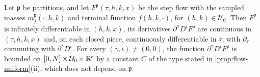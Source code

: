 \begin{lemma}\label{lem:flow-step-bounds}
Let $\mathfrak p$ be partitions, and let $F^{\mathfrak p}(\tau,h,k,x)$ be the step
flow with the sampled masses $m_j^{\mathfrak p}(\cdot,h,k)$ and terminal function
$f(h,k,\cdot)$, for $(h,k)\in\mathcal U_0$. Then $F^{\mathfrak p}$ is infinitely
differentiable in $(h,k,x)$, its derivatives $\partial^\gamma D^\iota F^{\mathfrak p}$
are continuous in $(\tau,h,k,x)$ and, on each closed piece, continuously
differentiable in $\tau$, with $\partial_\tau$ commuting with $\partial^\gamma
D^\iota$. For every $(\gamma,\iota)\ne(0,0)$, the function
$\partial^\gamma D^\iota F^{\mathfrak p}$ is bounded on $[0,N]\times\mathcal
U_0\times\mathbb R^\ell$ by a constant $C$ of the type stated in
\cref{prop:flow-uniform}(ii), which does not depend on $\mathfrak p$.
\end{lemma}

